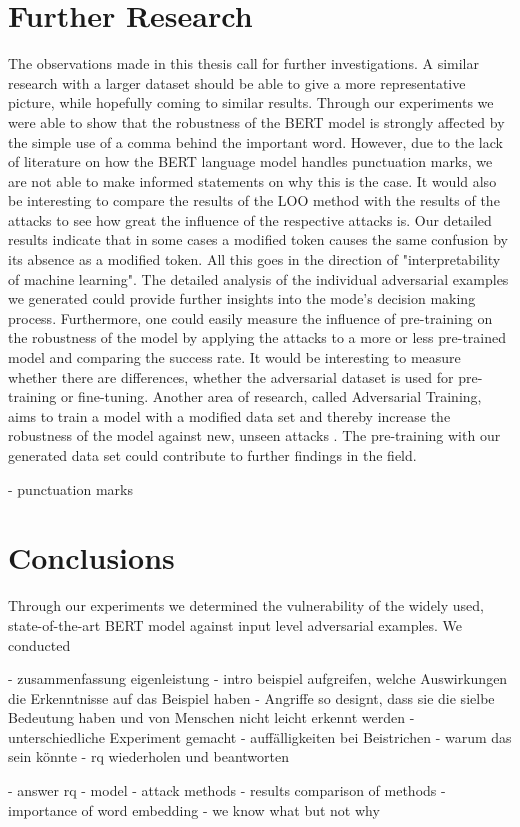 \section{Further Research}
The observations made in this thesis call for further investigations. 
A similar research with a larger dataset should be able to give a more representative picture, while hopefully coming to similar results. 
Through our experiments we were able to show that the robustness of the BERT model is strongly affected by the simple use of a comma behind the important word. However, due to the lack of literature on how the BERT language model handles punctuation marks, we are not able to make informed statements on why this is the case. It would also be interesting to compare the results of the LOO method with the results of the attacks to see how great the influence of the respective attacks is. Our detailed results indicate that in some cases a modified token causes the same confusion by its absence as a modified token. All this goes in the direction of "interpretability of machine learning". The detailed analysis of the individual adversarial examples we generated could provide further insights into the mode's decision making process.
Furthermore, one could easily measure the influence of pre-training on the robustness of the model by applying the attacks to a more or less pre-trained model and comparing the success rate. It would be interesting to measure whether there are differences, whether the adversarial dataset is used for pre-training or fine-tuning. Another area of research, called Adversarial Training, aims to train a model with a modified data set and thereby increase the robustness of the model against new, unseen attacks \cite{tramer2017ensemble}. The pre-training with our generated data set could contribute to further findings in the field. 


- punctuation marks


\section{Conclusions}

Through our experiments we determined the vulnerability of the widely used, state-of-the-art BERT model against input level adversarial examples. We conducted 

- zusammenfassung eigenleistung
- intro beispiel aufgreifen, welche Auswirkungen die Erkenntnisse auf das Beispiel haben
- Angriffe so designt, dass sie die sielbe Bedeutung haben und von Menschen nicht leicht erkennt werden 
- unterschiedliche Experiment gemacht
- auffälligkeiten bei Beistrichen
- warum das sein könnte
- rq wiederholen und beantworten



- answer rq
- model
- attack methods
- results comparison of methods
- importance of word embedding
- we know what but not why






\FloatBarrier


